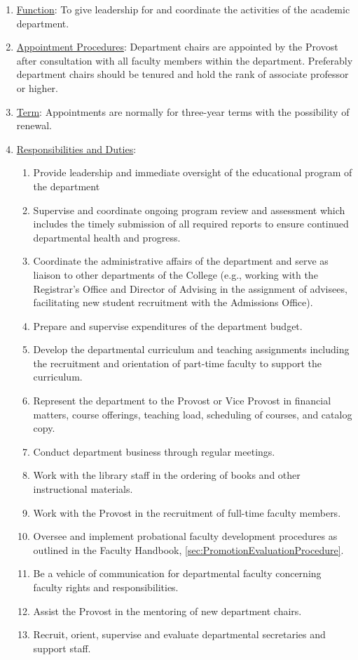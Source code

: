 \documentclass[letterpaper, 11pt]{article}
\newcounter{subsubparagraph}
\begin{document}
					\begin{enumerate}
						\item{\underline{Function}:  To give leadership for and coordinate the activities of the academic department.}
						\item{\underline{Appointment Procedures}:  Department chairs are appointed by the Provost after consultation with all faculty members within the department.  Preferably department chairs should be tenured and hold the rank of associate professor or higher.}
						\item{\underline{Term}:  Appointments are normally for three-year terms with the possibility of renewal.}
						\item{\underline{Responsibilities and Duties}:
							\begin{enumerate}
								\item{Provide leadership and immediate oversight of the educational program of the department}
								\item{Supervise and coordinate ongoing program review and assessment which includes the timely submission of all required reports to ensure continued departmental health and progress.}
								\item{Coordinate the administrative affairs of the department and serve as liaison to other departments of the College (e.g., working with the Registrar's Office and Director of Advising in the assignment of advisees, facilitating new student recruitment with the Admissions Office).}
								\item{Prepare and supervise expenditures of the department budget.}
								\item{Develop the departmental curriculum and teaching assignments including the recruitment and orientation of part-time faculty to support the curriculum.}
								\item{Represent the department to the Provost or Vice Provost in financial matters, course offerings, teaching load, scheduling of courses, and catalog copy.}
								\item{Conduct department business through regular meetings.}
								\item{Work with the library staff in the ordering of books and other instructional materials.}
								\item{Work with the Provost in the recruitment of full-time faculty members.}
								\item{Oversee and implement probational faculty development procedures as outlined in the Faculty Handbook, \autoref{sec:PromotionEvaluationProcedure}.}
								\item{Be a vehicle of communication for departmental faculty concerning faculty rights and responsibilities.}
								\item{Assist the Provost in the mentoring of new department chairs.}
								\item{Recruit, orient, supervise and evaluate departmental secretaries and support staff.}
							\end{enumerate}
						}
					\end{enumerate}
\end{document}
